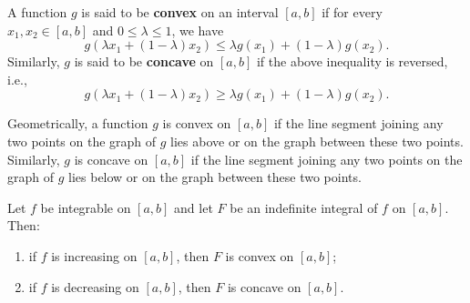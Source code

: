 	\begin{definitionenv}
		A function $g$ is said to be \textbf{convex} on an interval $[a,b]$ if for every $x_1,x_2\in [a,b]$ and $0\le \lambda \le 1$, we have
		\[
		g\left(\lambda x_1 + (1-\lambda)x_2\right) \le \lambda g(x_1) + (1-\lambda)g(x_2).
		\]
		Similarly, $g$ is said to be \textbf{concave} on $[a,b]$ if the above inequality is reversed, i.e.,
		\[
		g\left(\lambda x_1 + (1-\lambda)x_2\right) \ge \lambda g(x_1) + (1-\lambda)g(x_2).
		\]
	\end{definitionenv}
	\begin{remarkenv}
		Geometrically, a function $g$ is convex on $[a,b]$ if the line segment joining any two points on the graph of $g$ lies above or on the graph between these two points. Similarly, $g$ is concave on $[a,b]$ if the line segment joining any two points on the graph of $g$ lies below or on the graph between these two points.
	\end{remarkenv}
	\begin{theoremenv}
		Let $f$ be integrable on $[a,b]$ and let $F$ be an indefinite integral of $f$ on $[a,b]$. Then:
        \begin{enumerate}
            \item if $f$ is increasing on $[a,b]$, then $F$ is convex on $[a,b]$;
            \item if $f$ is decreasing on $[a,b]$, then $F$ is concave on $[a,b]$.
        \end{enumerate}
	\end{theoremenv}

	\newpage
